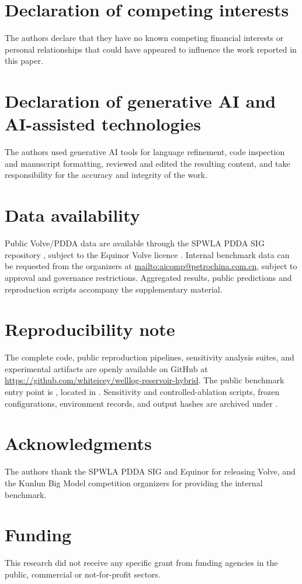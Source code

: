 \documentclass[preprint,12pt,nopreprintline]{elsarticle}
\begin{document}
\section*{Declaration of competing interests}
The authors declare that they have no known competing financial interests or personal relationships that could have appeared to influence the work reported in this paper.

\section*{Declaration of generative AI and AI-assisted technologies}
The authors used generative AI tools for language refinement, code inspection and manuscript formatting, reviewed and edited the resulting content, and take responsibility for the accuracy and integrity of the work.

\section*{Data availability}
Public Volve/PDDA data are available through the SPWLA PDDA SIG repository \cite{pddasig2021}, subject to the Equinor Volve licence \cite{volve2018}. Internal benchmark data can be requested from the organizers at \url{mailto:aicomp@petrochina.com.cn}, subject to approval and governance restrictions. Aggregated results, public predictions and reproduction scripts accompany the supplementary material.

\section*{Reproducibility note}
The complete code, public reproduction pipelines, sensitivity analysis suites, and experimental artifacts are openly available on GitHub at \url{https://github.com/whiteicey/welllog-reservoir-hybrid}. The public benchmark entry point is {\small{}}, located in {\small{}}. Sensitivity and controlled-ablation scripts, frozen configurations, environment records, and output hashes are archived under {\small{}}.

\section*{Acknowledgments}
The authors thank the SPWLA PDDA SIG and Equinor for releasing Volve, and the Kunlun Big Model competition organizers for providing the internal benchmark.

\section*{Funding}
This research did not receive any specific grant from funding agencies in the public, commercial or not-for-profit sectors.


\begingroup
\small
\setlength{\bibsep}{2.5pt}

\endgroup
\end{document}
